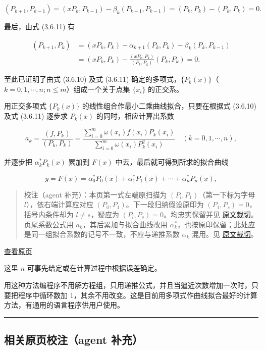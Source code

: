 \documentclass[
  10pt,
  fontset=fandol]{ctexart}
\begin{document}
\[
(P_{k+1},P_{k-1})=(xP_k,P_{k-1})-\beta_k(P_{k-1},P_{k-1})=(P_k,P_k)-(P_k,P_k)=0.
\]

最后，由式 (3.6.11) 有

\[
\begin{aligned}
(P_{k+1},P_k)&=(xP_k,P_k)-\alpha_{k+1}(P_k,P_k)-\beta_k(P_k,P_{k-1})\\
&=(xP_k,P_k)-\frac{(xP_k,P_k)}{(P_k,P_k)}(P_k,P_k)=0.
\end{aligned}
\]

至此已证明了由式 (3.6.10) 及式 (3.6.11) 确定的多项式，\(\{P_k(x)\}\)（\(k=0,1,\cdots,n;n\leqslant m\)）组成一个关于点集 \(\{x_i\}\) 的正交系。

用正交多项式 \(\{P_k(x)\}\) 的线性组合作最小二乘曲线拟合，只要在根据式 (3.6.10) 及式 (3.6.11) 逐步求 \(P_k(x)\) 的同时，相应计算出系数

\[
a_k=\frac{(f,P_k)}{(P_k,P_k)}=\frac{\displaystyle\sum_{i=0}^m\omega(x_i)f(x_i)P_k(x_i)}{\displaystyle\sum_{i=0}^m\omega(x_i)P_k^2(x_i)}\quad(k=0,1,\cdots,n),
\]

并逐步把 \(\alpha_k^*P_k(x)\) 累加到 \(F(x)\) 中去，最后就可得到所求的拟合曲线

\[
y=F(x)=\alpha_0^*P_0(x)+\alpha_1^*P_1(x)+\cdots+\alpha_n^*P_n(x),
\]

\begin{quote}
校注（agent 补充）：本页第一式左端原扫描为 \((P_l,P_1)\)（第一下标为字母 \(l\)），依右端计算应对应 \((P_0,P_1)\)。下一段归纳假设原印为 \((P_1,P_s)=0\)，括号内条件却为 \(l\ne s\)，疑应为 \((P_l,P_s)=0\)。均忠实保留并见 \href{../assets/ch03b/p083-induction-start.png}{原文裁切}。页尾系数公式用 \(a_k\)，其后累加与拟合曲线改用 \(\alpha_k^*\)，也按原印保留；此处应是同一组拟合系数的记号不一致，不应与递推系数 \(\alpha_k\) 混用。见 \href{../assets/ch03b/p083-fit-coefficients.png}{原文裁切}。
\end{quote}

\href{../../source-images/pdf-084.jpeg}{查看原页}

这里 \(n\) 可事先给定或在计算过程中根据误差确定。

用这种方法编程序不用解方程组，只用递推公式，并且当逼近次数增加一次时，只要把程序中循环数加 \(1\)，其余不用改变。这是目前用多项式作曲线拟合最好的计算方法，有通用的语言程序供用户使用。

\begin{center}\rule{0.5\linewidth}{0.5pt}\end{center}

\subsection{相关原页校注（agent 补充）}\label{ux76f8ux5173ux539fux9875ux6821ux6ce8agent-ux8865ux5145}
\end{document}
